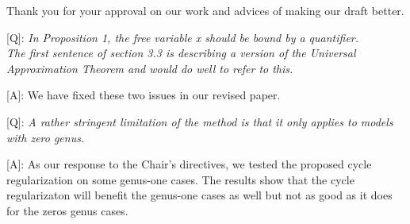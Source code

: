 \documentclass[10pt]{letter} %
\begin{document}
	Thank you for your approval on our work and advices of making our draft better.
	
	[Q]: \emph{In Proposition 1, the free variable x should be bound by a quantifier.
		\\The first sentence of section 3.3 is describing a version of the Universal Approximation Theorem and would do well to refer to this.}
	
	[A]: We have fixed these two issues in our revised paper. 
	
	[Q]: \emph{A rather stringent limitation of the method is that it only applies to models with zero genus.}
	
	[A]: As our response to the Chair's directives, we tested the proposed cycle regularization on some genus-one cases. The results show that the cycle regularizaton will benefit the genus-one cases as well but not as good as it does for the zeros genus cases.
\end{document}
